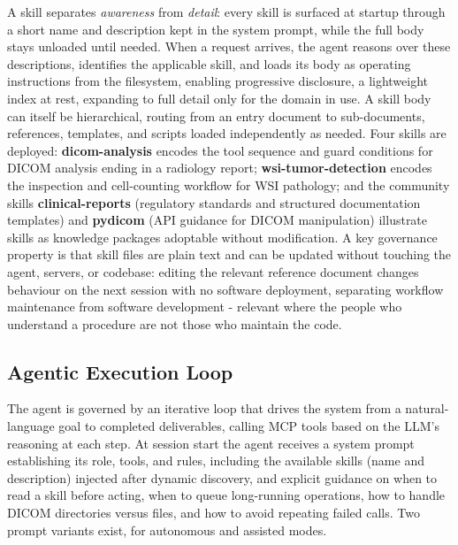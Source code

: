 \documentclass[1p,12pt]{elsarticle}
\begin{document}
A skill separates \emph{awareness} from \emph{detail}: every skill is surfaced at startup through a short name and description kept in the system prompt, while the full body stays unloaded until needed. When a request arrives, the agent reasons over these descriptions, identifies the applicable skill, and loads its body as operating instructions from the filesystem, enabling progressive disclosure, a lightweight index at rest, expanding to full detail only for the domain in use. A skill body can itself be hierarchical, routing from an entry document to sub-documents, references, templates, and scripts loaded independently as needed. Four skills are deployed: \textbf{dicom-analysis} encodes the tool sequence and guard conditions for DICOM analysis ending in a radiology report; \textbf{wsi-tumor-detection} encodes the inspection and cell-counting workflow for WSI pathology; and the community skills \textbf{clinical-reports} (regulatory standards and structured documentation templates) and \textbf{pydicom} (API guidance for DICOM manipulation) illustrate skills as knowledge packages adoptable without modification. A key governance property is that skill files are plain text and can be updated without touching the agent, servers, or codebase: editing the relevant reference document changes behaviour on the next session with no software deployment, separating workflow maintenance from software development - relevant where the people who understand a procedure are not those who maintain the code.

\subsection{Agentic Execution Loop}
The agent is governed by an iterative loop that drives the system from a natural-language goal to completed deliverables, calling MCP tools based on the LLM's reasoning at each step. At session start the agent receives a system prompt establishing its role, tools, and rules, including the available skills (name and description) injected after dynamic discovery, and explicit guidance on when to read a skill before acting, when to queue long-running operations, how to handle DICOM directories versus files, and how to avoid repeating failed calls. Two prompt variants exist, for autonomous and assisted modes.
\end{document}
